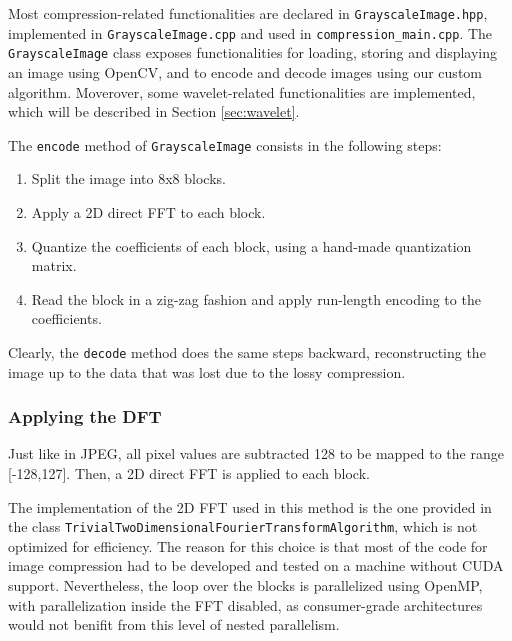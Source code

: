 Most compression-related functionalities are declared in \texttt{Grayscale\-Image.hpp}, implemented in \texttt{Grayscale\-Image.cpp} and used in \texttt{compression\_\-main\-.cpp}. The \texttt{GrayscaleImage} class exposes functionalities for loading, storing and displaying an image using OpenCV, and to encode and decode images using our custom algorithm. Moverover, some wavelet-related functionalities are implemented, which will be described in Section \ref{sec:wavelet}.

The \texttt{encode} method of \texttt{Grayscale\-Image} consists in the following steps:
\begin{enumerate}
    \item Split the image into 8x8 blocks.
    \item Apply a 2D direct FFT to each block.
    \item Quantize the coefficients of each block, using a hand-made quantization matrix.
    \item Read the block in a zig-zag fashion and apply run-length encoding to the coefficients.
\end{enumerate}
Clearly, the \texttt{decode} method does the same steps backward, reconstructing the image up to the data that was lost due to the lossy compression.

\subsubsection{Applying the DFT}
Just like in JPEG, all pixel values are subtracted 128 to be mapped to the range [-128,127]. Then, a 2D direct FFT is applied to each block.

The implementation of the 2D FFT used in this method is the one provided in the class \texttt{Trivial\-Two\-Dimensional\-Fourier\-Transform\-Algorithm}, which is not optimized for efficiency. The reason for this choice is that most of the code for image compression had to be developed and tested on a machine without CUDA support. Nevertheless, the loop over the blocks is parallelized using OpenMP, with parallelization inside the FFT disabled, as consumer-grade architectures would not benifit from this level of nested parallelism.

